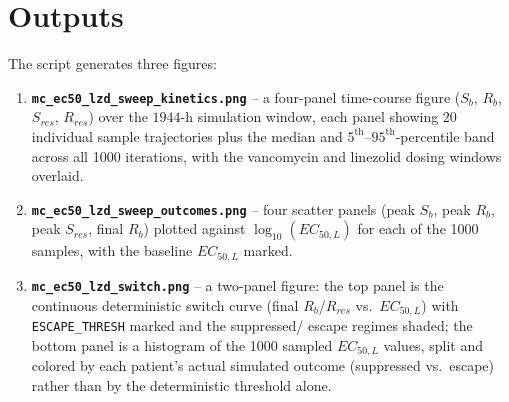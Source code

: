 \documentclass[11pt]{article}
\begin{document}
\section{Outputs}
\label{sec:outputs}

The script generates three figures:
\begin{enumerate}
\item \textbf{\texttt{mc\_ec50\_lzd\_sweep\_kinetics.png}} -- a four-panel
time-course figure ($S_b$, $R_b$, $S_{res}$, $R_{res}$) over the $1944$-h
simulation window, each panel showing 20 individual sample trajectories plus
the median and $5^{\mathrm{th}}$--$95^{\mathrm{th}}$-percentile band across
all 1000 iterations, with the vancomycin and linezolid dosing windows
overlaid.
\item \textbf{\texttt{mc\_ec50\_lzd\_sweep\_outcomes.png}} -- four scatter
panels (peak $S_b$, peak $R_b$, peak $S_{res}$, final $R_b$) plotted against
$\log_{10}(EC_{50,L})$ for each of the 1000 samples, with the baseline
$EC_{50,L}$ marked.
\item \textbf{\texttt{mc\_ec50\_lzd\_switch.png}} -- a two-panel figure: the
top panel is the continuous deterministic switch curve (final $R_b$/$R_{res}$
vs.\ $EC_{50,L}$) with \texttt{ESCAPE\_THRESH} marked and the suppressed/
escape regimes shaded; the bottom panel is a histogram of the 1000 sampled
$EC_{50,L}$ values, split and colored by each patient's actual simulated
outcome (suppressed vs.\ escape) rather than by the deterministic threshold
alone.
\end{enumerate}
\end{document}
